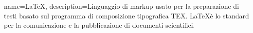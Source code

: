 \newglossaryentry{\LaTeX}
{
	name=\LaTeX,
	description={Linguaggio di markup usato per la preparazione di testi basato sul programma di composizione tipografica TEX. \LaTeX è lo standard per la comunicazione e la pubblicazione di documenti scientifici.}
}
